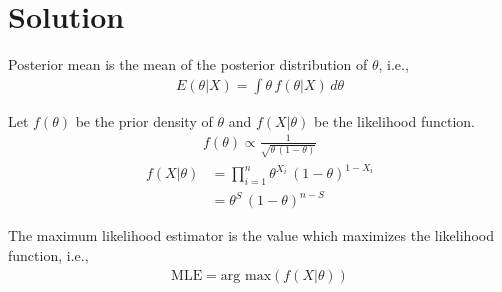 \documentclass[journal,12pt,twocolumn]{IEEEtran}
\begin{document}
\section*{Solution}
\begin{definition}
Posterior mean is the mean of the posterior distribution of $\theta$, i.e., 
\begin{align}
    E(\theta|X) = \int{\theta\,f(\theta|X)\,d\theta}\label{eq5}
\end{align}

\end{definition}
Let $f(\theta)$ be the prior density of $\theta$ and $f(X|\theta)$ be the likelihood function.
\begin{align}
    f(\theta) \propto \frac{1}{\sqrt{\theta\,(1-\theta)}}\label{eq6}
\end{align}
\begin{align}
    f(X|\theta) &= \prod_{i=1}^n\theta^{X_i}\,(1-\theta)^{1-X_i}\nonumber\\ 
    &=\theta^S\,(1-\theta)^{n-S}\label{eq7}
\end{align}
\begin{definition}
The maximum likelihood estimator is the value which maximizes the likelihood function, i.e.,
\begin{align}
    \text{MLE} = \text{arg max}(f(X|\theta))
\end{align}
\end{definition}
\end{document}

